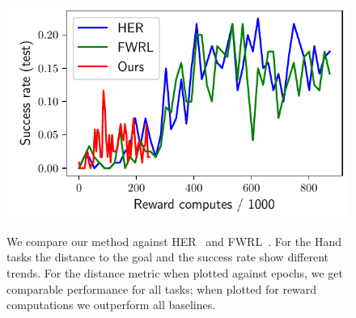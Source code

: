 \begin{figure}
  \includegraphics[width=\frac\columnwidth]{media/res/6efc1de-path_reward_low_thresh_chosen-HandManipulatePenRotate-v0-ddpg/reward_computes-test/success_rate.pdf}
  \label{fig:path-reward-hand}%
  \caption{We compare our method against HER~\citep{andrychowicz2016learning}
    and FWRL~\citep{dhiman2018floydwarshall}.
For the Hand tasks the distance to the goal and the success rate show different trends.
For the distance metric when plotted against epochs, we get comparable
performance for all tasks; when plotted for reward computations we outperform
all baselines.
}%
\end{figure}%
% 
